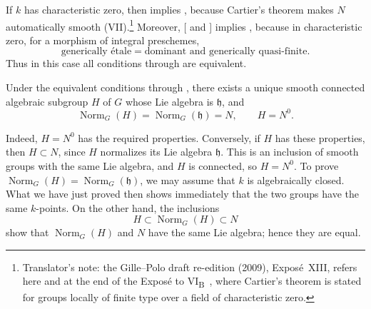 If \(k\) has characteristic zero, then  implies , because
Cartier's theorem makes \(N\) automatically smooth
(VII).\footnote{Translator's note: the Gille--Polo draft re-edition
(2009), Exposé~XIII, refers here and at the end of the Exposé to
VI\textsubscript{B}~, where Cartier's
theorem is stated for groups locally of finite type over a field of
characteristic zero.} Moreover, [ and ] implies ,
because in characteristic zero, for a morphism of integral
preschemes,
\[
  \text{generically étale}
  =
  \text{dominant and generically quasi-finite}.
\]
Thus in this case all conditions  through  are equivalent.

\begin{corollary}
Under the equivalent conditions  through , there exists a
unique smooth connected algebraic subgroup \(H\) of \(G\) whose Lie
algebra is \(\mathfrak h\), and
\[
  \operatorname{Norm}_G(H)
  =\operatorname{Norm}_G(\mathfrak h)
  =N,
  \qquad
  H=N^0.
\]
\end{corollary}

Indeed, \(H=N^0\) has the required properties. Conversely, if \(H\)
has these properties, then \(H\subset N\), since \(H\) normalizes its
Lie algebra \(\mathfrak h\). This is an inclusion of smooth groups
with the same Lie algebra, and \(H\) is connected, so \(H=N^0\). To
prove
\(\operatorname{Norm}_G(H)=\operatorname{Norm}_G(\mathfrak h)\), we
may assume that \(k\) is algebraically closed. What we have just proved
then shows immediately that the two groups have the same \(k\)-points.
On the other hand, the inclusions
\[
  H\subset\operatorname{Norm}_G(H)\subset N
\]
show that \(\operatorname{Norm}_G(H)\) and \(N\) have the same Lie
algebra; hence they are equal.

